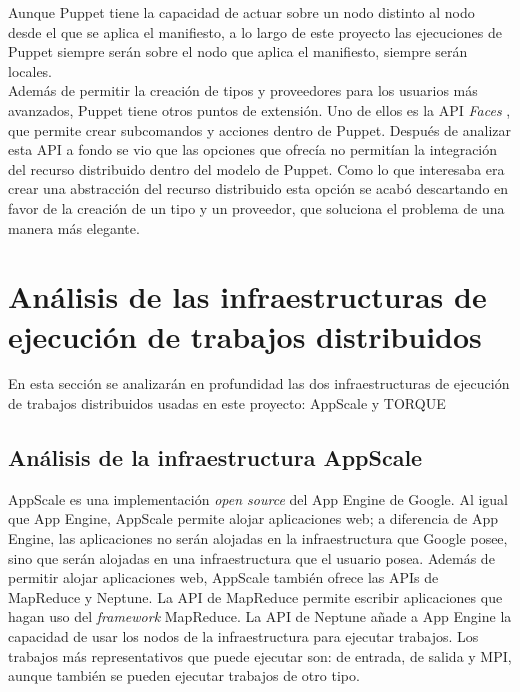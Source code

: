 Aunque Puppet tiene la capacidad de actuar sobre un nodo distinto al nodo desde el que se aplica el manifiesto, a lo largo de este proyecto las ejecuciones de Puppet siempre serán sobre el nodo que aplica el manifiesto, siempre serán locales. \\

Además de permitir la creación de tipos y proveedores para los usuarios más avanzados, Puppet tiene otros puntos de extensión. Uno de ellos es la API \emph{Faces} \cite{puppet-faces}, que permite crear subcomandos y acciones dentro de Puppet. Después de analizar esta API a fondo se vio que las opciones que ofrecía no permitían la integración del recurso distribuido dentro del modelo de Puppet. Como lo que interesaba era crear una abstracción del recurso distribuido esta opción se acabó descartando en favor de la creación de un tipo y un proveedor, que soluciona el problema de una manera más elegante.


\section{Análisis de las infraestructuras de ejecución de trabajos distribuidos}

En esta sección se analizarán en profundidad las dos infraestructuras de ejecución de trabajos distribuidos usadas en este proyecto: AppScale y TORQUE


\subsection{Análisis de la infraestructura AppScale}

AppScale es una implementación \emph{open source} del App Engine de Google. Al igual que App Engine, AppScale permite alojar aplicaciones web; a diferencia de App Engine, las aplicaciones no serán alojadas en la infraestructura que Google posee, sino que serán alojadas en una infraestructura que el usuario posea. Además de permitir alojar aplicaciones web, AppScale también ofrece las APIs de MapReduce y Neptune. La API de MapReduce permite escribir aplicaciones que hagan uso del \emph{framework} MapReduce. La API de Neptune añade a App Engine la capacidad de usar los nodos de la infraestructura para ejecutar trabajos. Los trabajos más representativos que puede ejecutar son: de entrada, de salida y MPI, aunque también se pueden ejecutar trabajos de otro tipo. \\

